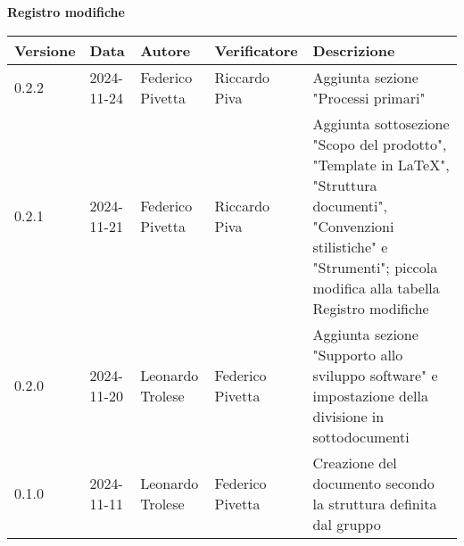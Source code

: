 
\begin{center}
\textbf{Registro modifiche}\\
\vspace{2mm}

\begin{tabularx}{\textwidth}{|l|l|l|l|X|}
\hline
\textbf{Versione} & \textbf{Data} & \textbf{Autore} & \textbf{Verificatore} & \textbf{Descrizione}\\
    \hline
    0.2.2 & 2024-11-24  & Federico Pivetta & Riccardo Piva & Aggiunta sezione "Processi primari" \\
    \hline
     0.2.1 & 2024-11-21  & Federico Pivetta  & Riccardo Piva& Aggiunta sottosezione "Scopo del prodotto", "Template in LaTeX", "Struttura documenti", "Convenzioni stilistiche" e "Strumenti"; piccola modifica alla tabella Registro modifiche\\
    \hline
    0.2.0 & 2024-11-20  & Leonardo Trolese & Federico Pivetta  & Aggiunta sezione "Supporto allo sviluppo software" e impostazione della divisione in sottodocumenti\\
    \hline
    0.1.0 & 2024-11-11  & Leonardo Trolese & Federico Pivetta  & Creazione del documento secondo la struttura definita dal gruppo\\
    \hline

\end{tabularx}
\end{center}